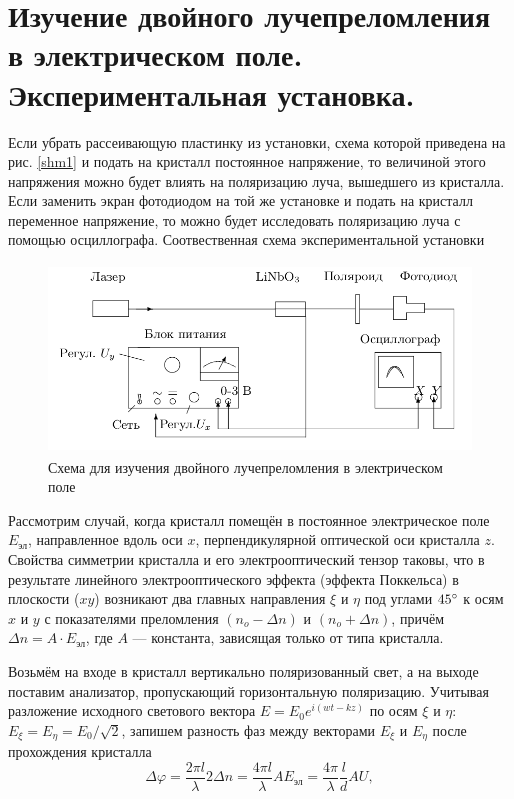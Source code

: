\documentclass[12pt]{article}
\begin{document}
\section*{Изучение двойного лучепреломления в электрическом поле. Экспериментальная установка.}
\par
	Если убрать рассеивающую пластинку из установки, схема которой приведена на рис. \ref{shm1} и подать на кристалл постоянное напряжение, то величиной этого напряжения можно будет влиять на поляризацию луча, вышедшего из кристалла. Если заменить экран фотодиодом на той же установке и подать на кристалл переменное напряжение, то можно будет исследовать поляризацию луча с помощью осциллографа. Соотвественная схема экспериментальной установки
\begin{figure}[h!]
	\centering
	\includegraphics[width = 12cm, height = 5cm]{image3.png}
	\caption{Схема для изучения двойного лучепреломления в электрическом поле}	
\end{figure}
\par
	Рассмотрим случай, когда кристалл помещён в постоянное электрическое поле $E_\text{эл}$, направленное вдоль оси $x$, перпендикулярной оптической оси кристалла $z$. Свойства симметрии кристалла и его электрооптический тензор таковы, что в результате линейного электрооптического эффекта (эффекта Поккельса) в плоскости ($xy$) возникают два главных направления $\xi$ и $\eta$ под углами $45 \degree$ к осям $x$ и $y$ с показателями преломления $(n_o - \Delta n)$ и $(n_o + \Delta n)$, причём $\Delta n = A \cdot E_\text{эл}$, где $A$ --- константа, зависящая только от типа кристалла.
\par
	Возьмём на входе в кристалл вертикально поляризованный свет, а на выходе поставим анализатор, пропускающий горизонтальную поляризацию. Учитывая разложение исходного светового вектора $E = E_0 e^{i(wt-kz)}$ по осям $\xi$ и $\eta$: $E_\xi = E_\eta = E_0 / \sqrt{2}$, запишем разность фаз между векторами $E_\xi$ и $E_\eta$ после прохождения кристалла
\[
	\Delta \varphi = \frac{2 \pi l}{\lambda} 2 \Delta n = \frac{4 \pi l}{\lambda} A E_\text{эл} = \frac{4 \pi}{\lambda} \frac{l}{d} A U,
\]
\end{document}
